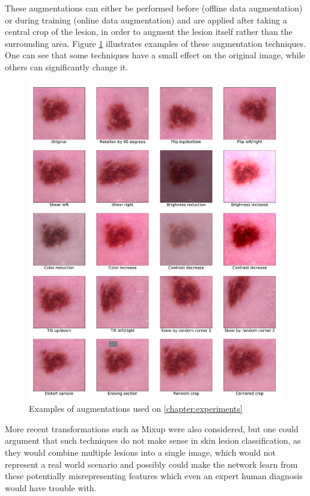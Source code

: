     These augmentations can either be performed before (offline data augmentation) or during training (online data augmentation) and are applied after taking a central crop of the lesion, in order to augment the lesion itself rather than the surrounding area. Figure \ref{fig:augmentations} illustrates examples of these augmentation techniques. One can see that some techniques have a small effect on the original image, while others can significantly change it. \par
    \begin{figure}[ht]
        \centering
        \includegraphics[width=\textwidth]{figs/augmentations.pdf}
        \caption{Examples of augmentations used on \autoref{chapter:experiments}}
        \label{fig:augmentations}
    \end{figure}
    
    More recent transformations such as Mixup \cite{mixup} were also considered, but one could argument that such techniques do not make sense in skin lesion classification, as they would combine multiple lesions into a single image, which would not represent a real world scenario and possibly could make the network learn from these potentially misrepresenting features which even an expert human diagnosis would have trouble with. \par

